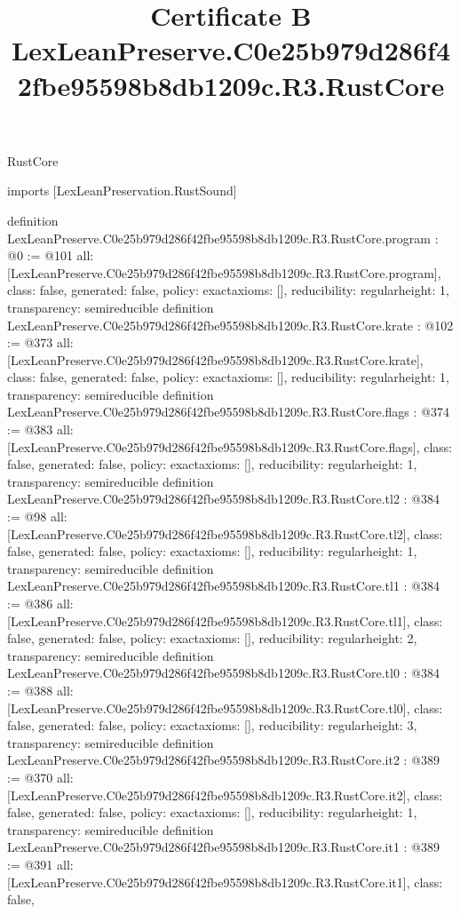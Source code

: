 \begin{lexlean}{RustCore}
\title{Certificate B LexLeanPreserve.C0e25b979d286f42fbe95598b8db1209c.R3.RustCore}
\begin{coremodule}
imports [LexLeanPreservation.RustSound]

definition LexLeanPreserve.C0e25b979d286f42fbe95598b8db1209c.R3.RustCore.program : @0 := @101 {
  all: [LexLeanPreserve.C0e25b979d286f42fbe95598b8db1209c.R3.RustCore.program],
  class: false,
  generated: false,
  policy: exact{axioms: []},
  reducibility: regular{height: 1},
  transparency: semireducible
}
definition LexLeanPreserve.C0e25b979d286f42fbe95598b8db1209c.R3.RustCore.krate : @102 := @373 {
  all: [LexLeanPreserve.C0e25b979d286f42fbe95598b8db1209c.R3.RustCore.krate],
  class: false,
  generated: false,
  policy: exact{axioms: []},
  reducibility: regular{height: 1},
  transparency: semireducible
}
definition LexLeanPreserve.C0e25b979d286f42fbe95598b8db1209c.R3.RustCore.flags : @374 := @383 {
  all: [LexLeanPreserve.C0e25b979d286f42fbe95598b8db1209c.R3.RustCore.flags],
  class: false,
  generated: false,
  policy: exact{axioms: []},
  reducibility: regular{height: 1},
  transparency: semireducible
}
definition LexLeanPreserve.C0e25b979d286f42fbe95598b8db1209c.R3.RustCore.tl2 : @384 := @98 {
  all: [LexLeanPreserve.C0e25b979d286f42fbe95598b8db1209c.R3.RustCore.tl2],
  class: false,
  generated: false,
  policy: exact{axioms: []},
  reducibility: regular{height: 1},
  transparency: semireducible
}
definition LexLeanPreserve.C0e25b979d286f42fbe95598b8db1209c.R3.RustCore.tl1 : @384 := @386 {
  all: [LexLeanPreserve.C0e25b979d286f42fbe95598b8db1209c.R3.RustCore.tl1],
  class: false,
  generated: false,
  policy: exact{axioms: []},
  reducibility: regular{height: 2},
  transparency: semireducible
}
definition LexLeanPreserve.C0e25b979d286f42fbe95598b8db1209c.R3.RustCore.tl0 : @384 := @388 {
  all: [LexLeanPreserve.C0e25b979d286f42fbe95598b8db1209c.R3.RustCore.tl0],
  class: false,
  generated: false,
  policy: exact{axioms: []},
  reducibility: regular{height: 3},
  transparency: semireducible
}
definition LexLeanPreserve.C0e25b979d286f42fbe95598b8db1209c.R3.RustCore.it2 : @389 := @370 {
  all: [LexLeanPreserve.C0e25b979d286f42fbe95598b8db1209c.R3.RustCore.it2],
  class: false,
  generated: false,
  policy: exact{axioms: []},
  reducibility: regular{height: 1},
  transparency: semireducible
}
definition LexLeanPreserve.C0e25b979d286f42fbe95598b8db1209c.R3.RustCore.it1 : @389 := @391 {
  all: [LexLeanPreserve.C0e25b979d286f42fbe95598b8db1209c.R3.RustCore.it1],
  class: false,
}
\end{coremodule}
\end{lexlean}
